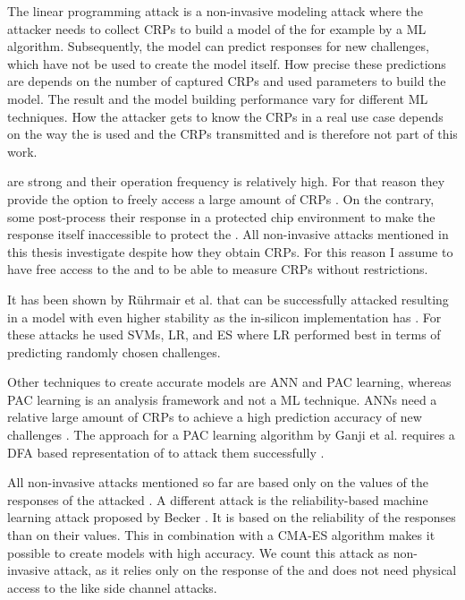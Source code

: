 The linear programming attack is a non-invasive modeling attack where the attacker needs to collect \acp{CRP} to build a model of the \puf for example by a \ac{ML} algorithm.
Subsequently, the model can predict responses for new challenges, which have not be used to create the model itself.
How precise these predictions are depends on the number of captured \acp{CRP} and used parameters to build the model. %
The result and the model building performance vary for different \ac{ML} techniques.
How the attacker gets to know the \acp{CRP} in a real use case depends on the way the \puf is used and the \acp{CRP} transmitted and is therefore not part of this work. %

\apufs are strong \pufs and their operation frequency is relatively high.
For that reason they provide the option to freely access a large amount of \acp{CRP} \cite{Ruhrmair2010ModelingFunctions}. %
On the contrary, some \pufs post-process their response in a protected chip environment to make the \puf response itself inaccessible to protect the \puf \cite{Suh2007PhysicalGeneration, Gassend2004IdentificationCircuits}.
All non-invasive attacks mentioned in this thesis investigate \pufs despite how they obtain \acp{CRP}.
For this reason I assume to have free access to the \puf and to be able to measure \acp{CRP} without restrictions.

It has been shown by Rührmair et al. that \apufs can be successfully attacked resulting in a model with even higher stability as the \apuf in-silicon implementation has \cite{Ruhrmair2010ModelingFunctions}.
For these attacks he used \acp{SVM}, \ac{LR}, and \ac{ES} where \ac{LR} performed best in terms of predicting randomly chosen challenges. %

Other techniques to create accurate \apuf models are \ac{ANN} and \ac{PAC} learning, whereas \ac{PAC} learning is an analysis framework and not a \ac{ML} technique. %
\acp{ANN} need a relative large amount of \acp{CRP} to achieve a high prediction accuracy of new challenges \cite{Hospodar2012MachineUsability}.
The approach for a \ac{PAC} learning algorithm by Ganji et al. requires a \ac{DFA} based representation of \apufs to attack them successfully \cite{Ganji2016PACPUFs}.

All non-invasive attacks mentioned so far are based only on the values of the responses of the attacked \puf.
A different attack is the reliability-based machine learning attack proposed by Becker \cite{Becker2015ThePUFs}. %
It is based on the reliability of the \puf responses than on their values. 
This in combination with a \ac{CMA-ES} algorithm makes it possible to create \apuf models with high accuracy.
We count this attack as non-invasive attack, as it relies only on the response of the \puf and does not need physical access to the \puf like side channel attacks.

